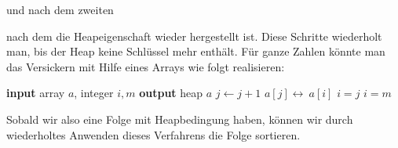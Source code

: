 \documentclass[tikz,12pt]{article}
\begin{document}
und nach dem zweiten
\begin{center}
\end{center}
nach dem die Heapeigenschaft wieder hergestellt ist.
Diese Schritte wiederholt man, bis der Heap keine Schlüssel mehr enthält. 
Für ganze Zahlen könnte man das Versickern mit Hilfe eines Arrays wie folgt realisieren:
\begin{algorithmic}[1]
  \State \textbf{input} array $a$, integer $i,m$
  \State \textbf{output} heap $a$
  \State $j\leftarrow j+1$
  \EndIf
  \EndIf
  \State $a[j]\leftrightarrow\ a[i]$
  \State $i = j$
  \Else
  \State $i = m$
  \EndIf
  \EndWhile
  \EndProcedure
\end{algorithmic}
Sobald wir also eine Folge mit Heapbedingung haben, können wir durch wiederholtes Anwenden dieses Verfahrens die Folge sortieren.
\end{document}
